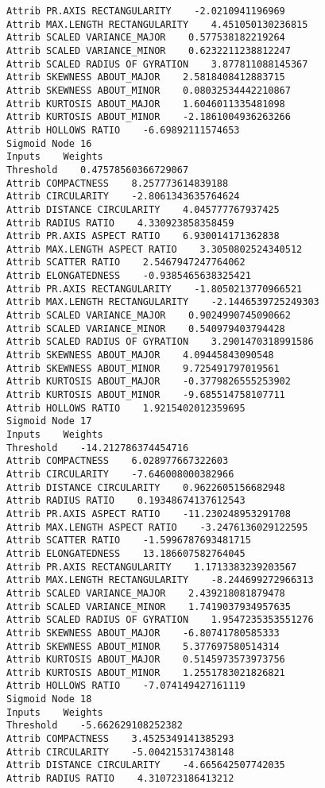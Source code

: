 \documentclass[
	article,			%
	11pt,				%
	oneside,			%
	a4paper,			%
	english,			%
	brazil,				%
	sumario=tradicional
	]{abntex2}
\begin{document}
\begin{lstlisting}
Attrib PR.AXIS RECTANGULARITY    -2.0210941196969
Attrib MAX.LENGTH RECTANGULARITY    4.451050130236815
Attrib SCALED VARIANCE_MAJOR    0.577538182219264
Attrib SCALED VARIANCE_MINOR    0.6232211238812247
Attrib SCALED RADIUS OF GYRATION    3.877811088145367
Attrib SKEWNESS ABOUT_MAJOR    2.5818408412883715
Attrib SKEWNESS ABOUT_MINOR    0.08032534442210867
Attrib KURTOSIS ABOUT_MAJOR    1.6046011335481098
Attrib KURTOSIS ABOUT_MINOR    -2.1861004936263266
Attrib HOLLOWS RATIO    -6.69892111574653
Sigmoid Node 16
Inputs    Weights
Threshold    0.47578560366729067
Attrib COMPACTNESS    8.257773614839188
Attrib CIRCULARITY    -2.8061343635764624
Attrib DISTANCE CIRCULARITY    4.045777767937425
Attrib RADIUS RATIO    4.330923858358459
Attrib PR.AXIS ASPECT RATIO    6.930014171362838
Attrib MAX.LENGTH ASPECT RATIO    3.3050802524340512
Attrib SCATTER RATIO    2.5467947247764062
Attrib ELONGATEDNESS    -0.9385465638325421
Attrib PR.AXIS RECTANGULARITY    -1.8050213770966521
Attrib MAX.LENGTH RECTANGULARITY    -2.1446539725249303
Attrib SCALED VARIANCE_MAJOR    0.9024990745090662
Attrib SCALED VARIANCE_MINOR    0.540979403794428
Attrib SCALED RADIUS OF GYRATION    3.2901470318991586
Attrib SKEWNESS ABOUT_MAJOR    4.09445843090548
Attrib SKEWNESS ABOUT_MINOR    9.725491797019561
Attrib KURTOSIS ABOUT_MAJOR    -0.3779826555253902
Attrib KURTOSIS ABOUT_MINOR    -9.685514758107711
Attrib HOLLOWS RATIO    1.9215402012359695
Sigmoid Node 17
Inputs    Weights
Threshold    -14.212786374454716
Attrib COMPACTNESS    6.028977667322603
Attrib CIRCULARITY    -7.646008000382966
Attrib DISTANCE CIRCULARITY    0.9622605156682948
Attrib RADIUS RATIO    0.19348674137612543
Attrib PR.AXIS ASPECT RATIO    -11.230248953291708
Attrib MAX.LENGTH ASPECT RATIO    -3.2476136029122595
Attrib SCATTER RATIO    -1.5996787693481715
Attrib ELONGATEDNESS    13.186607582764045
Attrib PR.AXIS RECTANGULARITY    1.1713383239203567
Attrib MAX.LENGTH RECTANGULARITY    -8.244699272966313
Attrib SCALED VARIANCE_MAJOR    2.439218081879478
Attrib SCALED VARIANCE_MINOR    1.7419037934957635
Attrib SCALED RADIUS OF GYRATION    1.9547235353551276
Attrib SKEWNESS ABOUT_MAJOR    -6.80741780585333
Attrib SKEWNESS ABOUT_MINOR    5.377697580514314
Attrib KURTOSIS ABOUT_MAJOR    0.5145973573973756
Attrib KURTOSIS ABOUT_MINOR    1.2551783021826821
Attrib HOLLOWS RATIO    -7.074149427161119
Sigmoid Node 18
Inputs    Weights
Threshold    -5.662629108252382
Attrib COMPACTNESS    3.4525349141385293
Attrib CIRCULARITY    -5.004215317438148
Attrib DISTANCE CIRCULARITY    -4.665642507742035
Attrib RADIUS RATIO    4.310723186413212

\end{lstlisting}
\end{document}
